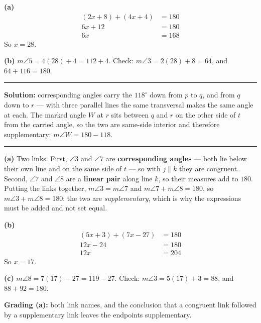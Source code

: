 \documentclass[12pt]{article}
\begin{document}
\textbf{(a)}
\begin{align*}
  (2x + 8) + (4x + 4) &= 180 \\
  6x + 12 &= 180 \\
  6x &= 168
\end{align*}
So $x = 28$. 

\textbf{(b)} $m\angle 5 = 4(28) + 4 = 112 + 4$. Check: $m\angle 3 = 2(28) + 8 = 64$, and $64 + 116 = 180$. 

\vspace{0.2cm}\noindent\rule{\linewidth}{0.2pt}


\textbf{Solution:} corresponding angles carry the $118^\circ$ down from $p$ to $q$, and from $q$ down to $r$ --- with three parallel lines the same transversal makes the same angle at each. The marked angle $W$ at $r$ sits between $q$ and $r$ on the other side of $t$ from the carried angle, so the two are same-side interior and therefore supplementary: $m\angle W = 180 - 118$. 

\vspace{0.2cm}\noindent\rule{\linewidth}{0.2pt}


\textbf{(a)} Two links. First, $\angle 3$ and $\angle 7$ are \textbf{corresponding angles} --- both lie below their own line and on the same side of $t$ --- so with $j \parallel k$ they are congruent. Second, $\angle 7$ and $\angle 8$ are a \textbf{linear pair} along line $k$, so their measures add to $180$. Putting the links together, $m\angle 3 = m\angle 7$ and $m\angle 7 + m\angle 8 = 180$, so $m\angle 3 + m\angle 8 = 180$: the two are \emph{supplementary}, which is why the expressions must be added and not set equal.

\textbf{(b)}
\begin{align*}
  (5x + 3) + (7x - 27) &= 180 \\
  12x - 24 &= 180 \\
  12x &= 204
\end{align*}
So $x = 17$. 

\textbf{(c)} $m\angle 8 = 7(17) - 27 = 119 - 27$. Check: $m\angle 3 = 5(17) + 3 = 88$, and $88 + 92 = 180$. 

\textbf{Grading (a):} both link names, and the conclusion that a congruent link followed by a supplementary link leaves the endpoints supplementary.
\end{document}
